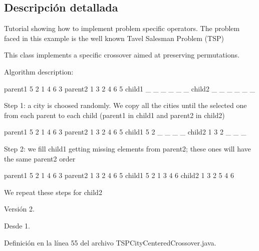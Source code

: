 \subsection{Descripción detallada}
Tutorial showing how to implement problem specific operators. The problem faced in this example is the well known Tavel Salesman Problem (T\-S\-P)

This class implements a specific crossover aimed at preserving permutations.

Algorithm description\-: 
\begin{DoxyPre}
      parent1  5 2 1 4 6 3     parent2   1 3 2 4 6 5
      child1   \_ \_ \_ \_ \_ \_     child2    \_ \_ \_ \_ \_ \_
\end{DoxyPre}
 Step 1\-: a city is choosed randomly. We copy all the cities until the selected one from each parent to each child (parent1 in child1 and parent2 in child2) 
\begin{DoxyPre}
      parent1  5 2 1 4 6 3     parent2   1 3 2 4 6 5
      child1   5 2 \_ \_ \_ \_     child2    1 3 2 \_ \_ \_
 \end{DoxyPre}
 Step 2\-: we fill child1 getting missing elements from parent2; these ones will have the same parent2 order 
\begin{DoxyPre}
      parent1  5 2 1 4 6 3     parent2  1 3 2 4 6 5
      child1   5 2 1 3 4 6     child2   1 3 2 5 4 6
\end{DoxyPre}


We repeat these steps for child2

\begin{DoxyVersion}{Versión}
2. 
\end{DoxyVersion}
\begin{DoxySince}{Desde}
1. 
\end{DoxySince}


Definición en la línea 55 del archivo T\-S\-P\-City\-Centered\-Crossover.\-java.



